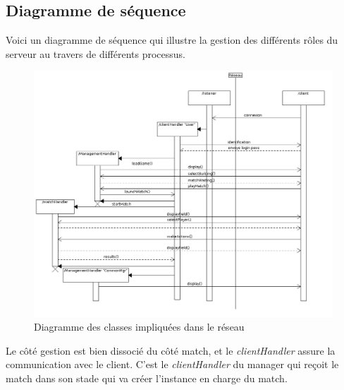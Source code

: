 \documentclass[a4paper,titlepage]{scrreprt}
\begin{document}
  \subsection{Diagramme de séquence}
  Voici un diagramme de séquence qui illustre la gestion des différents
  rôles du serveur au travers de différents processus.
    \begin{figure}[H]
    \center
    \includegraphics[scale=0.4]{uml/class/connexionserveurclient.png}
    \caption{Diagramme des classes impliquées dans le réseau}
    \end{figure}

  Le côté gestion est bien dissocié du côté match, et le \emph{clientHandler} assure la communication avec le client.
  C'est le \emph{clientHandler} du manager qui reçoit le match dans son stade
  qui va créer l'instance en charge du match.
\end{document}
